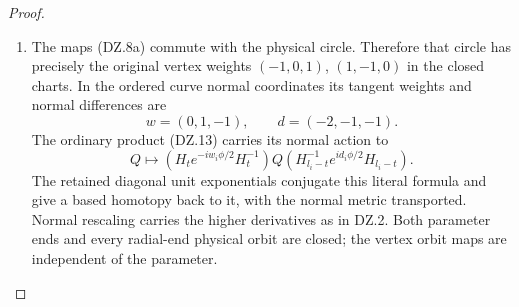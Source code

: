 \begin{proof}
\begin{enumerate}[label=\arabic*.]
\par

\medskip\noindent\textbf{DZ.3. Actual circle traces, derivative and the diagonal right integer}

\par\nobreak

\item The maps (DZ.8a) commute with the physical circle. Therefore that
circle has precisely the original vertex weights
\((-1,0,1)\), \((1,-1,0)\) in the closed charts. In the ordered
curve normal coordinates its tangent weights and normal differences
are
\[
                  w=(0,1,-1),\qquad d=(-2,-1,-1).
\]
The ordinary product (DZ.13) carries its normal action to
\[
 Q\longmapsto
 (H_t e^{-iw_i\phi/2}H_t^{-1})Q
 (H_{l_i-t}^{-1}e^{id_i\phi/2}H_{l_i-t}).            \tag{DZ.15}
\]
The retained diagonal unit exponentials conjugate this literal
formula and give a based homotopy back to it, with the normal metric
transported. Normal rescaling carries the higher derivatives as in
DZ.2. Both parameter ends and every radial-end physical orbit are
closed; the vertex orbit maps are independent of the parameter.


\end{enumerate}
\end{proof}
